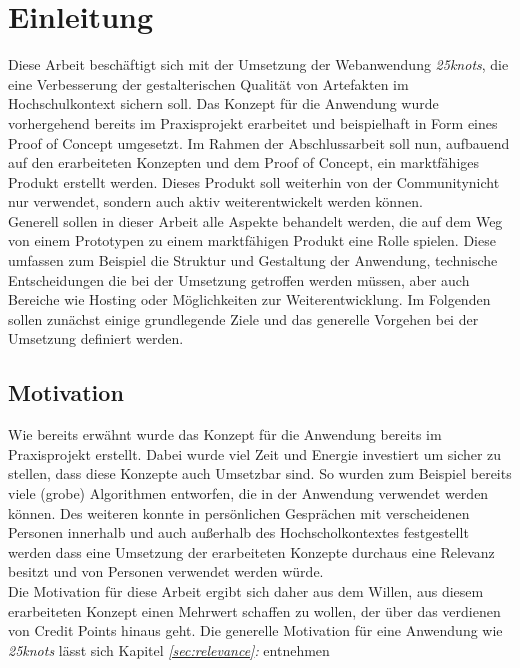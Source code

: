 \chapter{Einleitung}
\thispagestyle{fancy}
Diese Arbeit beschäftigt sich mit der Umsetzung der Webanwendung \textit{25knots}, die eine Verbesserung der gestalterischen Qualität von Artefakten im Hochschulkontext sichern soll.
Das Konzept für die Anwendung wurde vorhergehend bereits im Praxisprojekt erarbeitet und beispielhaft in Form eines Proof of Concept umgesetzt. Im Rahmen der Abschlussarbeit soll nun, aufbauend auf den erarbeiteten Konzepten und dem Proof of Concept, ein marktfähiges Produkt erstellt werden. Dieses Produkt soll weiterhin von der Community\footnotemark nicht nur verwendet, sondern auch aktiv weiterentwickelt werden können.\\

Generell sollen in dieser Arbeit alle Aspekte behandelt werden, die auf dem Weg von einem Prototypen zu einem marktfähigen Produkt eine Rolle spielen. Diese umfassen zum Beispiel die Struktur und Gestaltung der Anwendung, technische Entscheidungen die bei der Umsetzung getroffen werden müssen, aber auch Bereiche wie Hosting oder Möglichkeiten zur Weiterentwicklung.
Im Folgenden sollen zunächst einige grundlegende Ziele und das generelle Vorgehen bei der Umsetzung definiert werden.


\section{Motivation}
Wie bereits erwähnt wurde das Konzept für die Anwendung bereits im Praxisprojekt erstellt. Dabei wurde viel Zeit und Energie investiert um sicher zu stellen, dass diese Konzepte auch Umsetzbar sind. So wurden zum Beispiel bereits viele (grobe) Algorithmen entworfen, die in der Anwendung verwendet werden können.
Des weiteren konnte in persönlichen Gesprächen mit verscheidenen Personen innerhalb und auch außerhalb des Hochscholkontextes festgestellt werden dass eine Umsetzung der erarbeiteten Konzepte durchaus eine Relevanz besitzt und von Personen verwendet werden würde.\\

Die Motivation für diese Arbeit ergibt sich daher aus dem Willen, aus diesem erarbeiteten Konzept einen Mehrwert schaffen zu wollen, der über das verdienen von Credit Points hinaus geht. Die generelle Motivation für eine Anwendung wie \textit{25knots} lässt sich Kapitel \textit{\ref{sec:relevance}: } entnehmen

